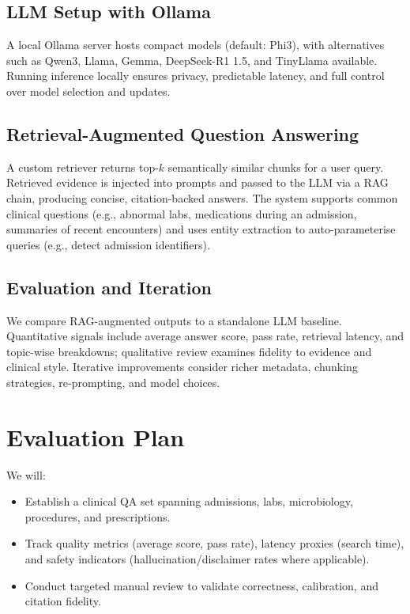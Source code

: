 \subsection{LLM Setup with Ollama}
A local Ollama server hosts compact models (default: Phi3), with alternatives such as Qwen3, Llama, Gemma, DeepSeek-R1 1.5, and TinyLlama available. Running inference locally ensures privacy, predictable latency, and full control over model selection and updates.

\subsection{Retrieval-Augmented Question Answering}
A custom retriever returns top-$k$ semantically similar chunks for a user query. Retrieved evidence is injected into prompts and passed to the LLM via a RAG chain, producing concise, citation-backed answers. The system supports common clinical questions (e.g., abnormal labs, medications during an admission, summaries of recent encounters) and uses entity extraction to auto-parameterise queries (e.g., detect admission identifiers).

\subsection{Evaluation and Iteration}
We compare RAG-augmented outputs to a standalone LLM baseline. Quantitative signals include average answer score, pass rate, retrieval latency, and topic-wise breakdowns; qualitative review examines fidelity to evidence and clinical style. Iterative improvements consider richer metadata, chunking strategies, re-prompting, and model choices.

\section{Evaluation Plan}
We will:
\begin{itemize}
  \item Establish a clinical QA set spanning admissions, labs, microbiology, procedures, and prescriptions.
  \item Track quality metrics (average score, pass rate), latency proxies (search time), and safety indicators (hallucination/disclaimer rates where applicable).
  \item Conduct targeted manual review to validate correctness, calibration, and citation fidelity.
\end{itemize}

